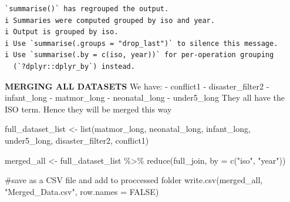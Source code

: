 \documentclass[
  letterpaper,
  DIV=11,
  numbers=noendperiod]{scrartcl}
\newenvironment{Shaded}{\begin{snugshade}}{\end{snugshade}}
\newcommand{\AttributeTok}[1]{\textcolor[rgb]{0.40,0.45,0.13}{#1}}
\newcommand{\CommentTok}[1]{\textcolor[rgb]{0.37,0.37,0.37}{#1}}
\newcommand{\ConstantTok}[1]{\textcolor[rgb]{0.56,0.35,0.01}{#1}}
\newcommand{\FunctionTok}[1]{\textcolor[rgb]{0.28,0.35,0.67}{#1}}
\newcommand{\NormalTok}[1]{\textcolor[rgb]{0.00,0.23,0.31}{#1}}
\newcommand{\OtherTok}[1]{\textcolor[rgb]{0.00,0.23,0.31}{#1}}
\newcommand{\SpecialCharTok}[1]{\textcolor[rgb]{0.37,0.37,0.37}{#1}}
\newcommand{\StringTok}[1]{\textcolor[rgb]{0.13,0.47,0.30}{#1}}
\begin{document}
\begin{verbatim}
`summarise()` has regrouped the output.
i Summaries were computed grouped by iso and year.
i Output is grouped by iso.
i Use `summarise(.groups = "drop_last")` to silence this message.
i Use `summarise(.by = c(iso, year))` for per-operation grouping
  (`?dplyr::dplyr_by`) instead.
\end{verbatim}

\textbf{MERGING ALL DATASETS} We have: - conflict1 - disaster\_filter2 -
infant\_long - matmor\_long - neonatal\_long - under5\_long They all
have the ISO term. Hence they will be merged this way

\begin{Shaded}
\begin{Highlighting}[]
\NormalTok{full\_dataset\_list }\OtherTok{\textless{}{-}} \FunctionTok{list}\NormalTok{(matmor\_long, neonatal\_long, infant\_long, under5\_long, disaster\_filter2, conflict1)}

\NormalTok{merged\_all }\OtherTok{\textless{}{-}}\NormalTok{ full\_dataset\_list }\SpecialCharTok{\%\textgreater{}\%} \FunctionTok{reduce}\NormalTok{(full\_join, }\AttributeTok{by =} \FunctionTok{c}\NormalTok{(}\StringTok{"iso"}\NormalTok{, }\StringTok{"year"}\NormalTok{))}

\CommentTok{\#save as a CSV file and add to proccessed folder }
\FunctionTok{write.csv}\NormalTok{(merged\_all, }\StringTok{"Merged\_Data.csv"}\NormalTok{, }\AttributeTok{row.names =} \ConstantTok{FALSE}\NormalTok{)}
\end{Highlighting}
\end{Shaded}
\end{document}
